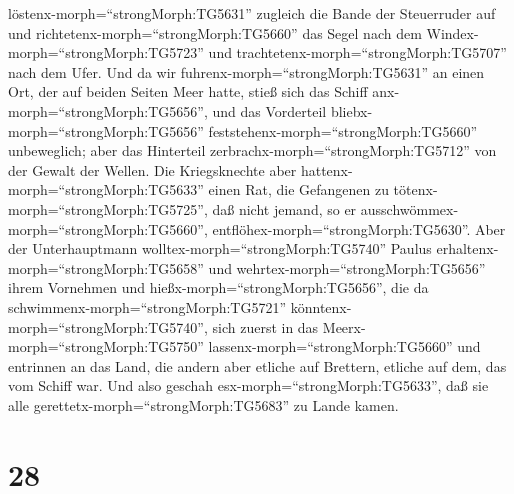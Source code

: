 löstenx-morph=``strongMorph:TG5631'' zugleich die Bande der Steuerruder
auf und richtetenx-morph=``strongMorph:TG5660'' das Segel nach dem
Windex-morph=``strongMorph:TG5723'' und
trachtetenx-morph=``strongMorph:TG5707'' nach dem Ufer. 
Und da wir fuhrenx-morph=``strongMorph:TG5631'' an einen Ort, der auf
beiden Seiten Meer hatte, stieß sich das Schiff
anx-morph=``strongMorph:TG5656'', und das Vorderteil
bliebx-morph=``strongMorph:TG5656''
feststehenx-morph=``strongMorph:TG5660'' unbeweglich; aber das
Hinterteil zerbrachx-morph=``strongMorph:TG5712'' von der Gewalt der
Wellen.  Die Kriegsknechte aber
hattenx-morph=``strongMorph:TG5633'' einen Rat, die Gefangenen zu
tötenx-morph=``strongMorph:TG5725'', daß nicht jemand, so er
ausschwömmex-morph=``strongMorph:TG5660'',
entflöhex-morph=``strongMorph:TG5630''.  Aber der
Unterhauptmann wolltex-morph=``strongMorph:TG5740'' Paulus
erhaltenx-morph=``strongMorph:TG5658'' und
wehrtex-morph=``strongMorph:TG5656'' ihrem Vornehmen und
hießx-morph=``strongMorph:TG5656'', die da
schwimmenx-morph=``strongMorph:TG5721''
könntenx-morph=``strongMorph:TG5740'', sich zuerst in das
Meerx-morph=``strongMorph:TG5750'' lassenx-morph=``strongMorph:TG5660''
und entrinnen an das Land,  die andern aber etliche auf
Brettern, etliche auf dem, das vom Schiff war. Und also geschah
esx-morph=``strongMorph:TG5633'', daß sie alle
gerettetx-morph=``strongMorph:TG5683'' zu Lande kamen.

\hypertarget{section-27}{%
\section{28}\label{section-27}}

